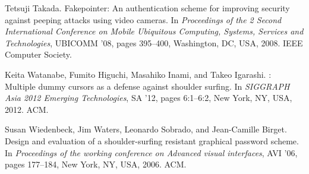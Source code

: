 \documentclass[12pt,onecolumn]{article}
\begin{document}
\begin{thebibliography}{10}
Tetsuji Takada.
\newblock Fakepointer: {A}n authentication scheme for improving security
  against peeping attacks using video cameras.
\newblock In {\em Proceedings of the 2 Second International Conference on
  Mobile Ubiquitous Computing, Systems, Services and Technologies}, UBICOMM
  '08, pages 395--400, Washington, DC, USA, 2008. IEEE Computer Society.

Keita Watanabe, Fumito Higuchi, Masahiko Inami, and Takeo Igarashi.
: {M}ultiple dummy cursors as a defense against
  shoulder surfing.
\newblock In {\em SIGGRAPH Asia 2012 Emerging Technologies}, SA '12, pages
  6:1--6:2, New York, NY, USA, 2012. ACM.

Susan Wiedenbeck, Jim Waters, Leonardo Sobrado, and Jean-Camille Birget.
\newblock Design and evaluation of a shoulder-surfing resistant graphical
  password scheme.
\newblock In {\em Proceedings of the working conference on Advanced visual
  interfaces}, AVI '06, pages 177--184, New York, NY, USA, 2006. ACM.

\end{thebibliography}
\end{document}
